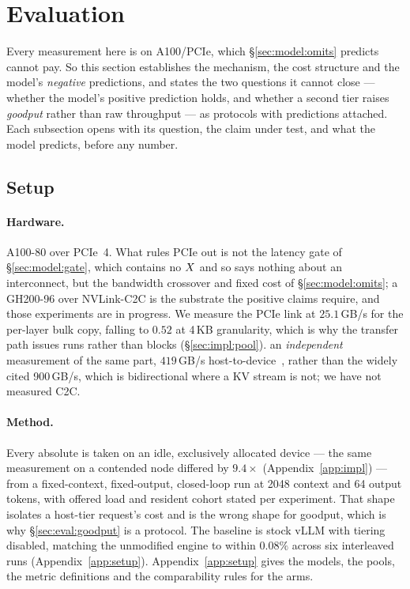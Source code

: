 \section{Evaluation}
\label{sec:eval}

Every measurement here is on A100/PCIe, which \S\ref{sec:model:omits} predicts
cannot pay. So this section establishes the mechanism, the cost structure and the
model's \emph{negative} predictions, and states the two questions it cannot close
--- whether the model's positive prediction holds, and whether a second tier
raises \emph{goodput} rather than raw throughput --- as protocols with predictions
attached. Each subsection opens with its question, the claim under test, and what
the model predicts, before any number.

\subsection{Setup}
\label{sec:eval:setup}

\paragraph{Hardware.} A100-80 over PCIe~4. What rules PCIe out is not the latency
gate of \S\ref{sec:model:gate}, which contains no $X$ and so says nothing about
an interconnect, but the bandwidth crossover and fixed cost of
\S\ref{sec:model:omits}; a GH200-96 over NVLink-C2C is the substrate the positive
claims require, and those experiments are in progress. We measure the PCIe link at
$25.1$\,GB/s for the per-layer bulk copy, falling to $0.52$ at 4\,KB granularity,
which is why the transfer path issues runs rather than blocks
(\S\ref{sec:impl:pool}).
an \emph{independent} measurement of the same part, $419$\,GB/s
host-to-device~\cite{pie}, rather than the widely cited 900\,GB/s, which is
bidirectional where a KV stream is not; we have not measured C2C.

\paragraph{Method.} Every absolute is taken on an idle, exclusively allocated device
--- the same measurement on a contended node differed by $9.4\times$
(Appendix~\ref{app:impl}) --- from a fixed-context, fixed-output, closed-loop run at
2048 context and 64 output tokens, with offered load and resident cohort stated per
experiment. That shape isolates a host-tier request's cost and is the wrong shape for
goodput, which is why \S\ref{sec:eval:goodput} is a protocol. The baseline is stock
vLLM with tiering disabled, matching the unmodified engine to within $0.08\%$ across
six interleaved runs (Appendix~\ref{app:setup}).
Appendix~\ref{app:setup} gives the models, the pools, the metric definitions and
the comparability rules for the arms.

